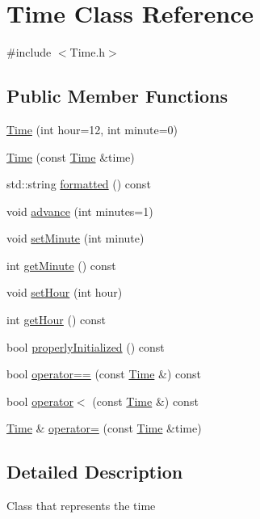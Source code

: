 \hypertarget{classTime}{}\section{Time Class Reference}
\label{classTime}


{\ttfamily \#include $<$Time.\+h$>$}

\subsection*{Public Member Functions}
\begin{DoxyCompactItemize}
\item 
\hyperlink{classTime_a90d3b9a3fb4516e7ccb4c60deba03807}{Time} (int hour=12, int minute=0)
\item 
\hyperlink{classTime_a8d758b905e2fda239938ae0ee320453f}{Time} (const \hyperlink{classTime}{Time} \&time)
\item 
std\+::string \hyperlink{classTime_aeeb2d2b5a624d0d78b7f5d146d0682f5}{formatted} () const 
\item 
void \hyperlink{classTime_a41c94422f10c95daab849b9c20afdeba}{advance} (int minutes=1)
\item 
void \hyperlink{classTime_a9c53c93d10be3785c85449186beb6b6a}{set\+Minute} (int minute)
\item 
int \hyperlink{classTime_a6ccac73be7aacc12410cea6b3d216357}{get\+Minute} () const 
\item 
void \hyperlink{classTime_ab77d5f9f5fa8582d23a70d418ab6a182}{set\+Hour} (int hour)
\item 
int \hyperlink{classTime_a4e9d93c2aaaac84b0a49f44184968860}{get\+Hour} () const 
\item 
bool \hyperlink{classTime_ab29d371ddb19ce156377cea159efafef}{properly\+Initialized} () const 
\item 
bool \hyperlink{classTime_adeb3173efb2cb16bf361db0204a85c7c}{operator==} (const \hyperlink{classTime}{Time} \&) const 
\item 
bool \hyperlink{classTime_aa668f56a3ee77c147e7dc76bf1ad89f1}{operator$<$} (const \hyperlink{classTime}{Time} \&) const 
\item 
\hyperlink{classTime}{Time} \& \hyperlink{classTime_a7801190e243f4b6662d7d9ebadbd342f}{operator=} (const \hyperlink{classTime}{Time} \&time)
\end{DoxyCompactItemize}


\subsection{Detailed Description}
Class that represents the time 

